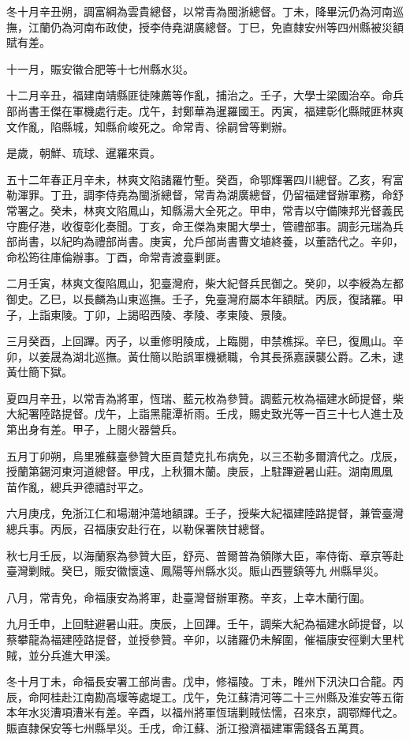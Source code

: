 \begin{pinyinscope}
冬十月辛丑朔，調富綱為雲貴總督，以常青為閩浙總督。丁未，降畢沅仍為河南巡撫，江蘭仍為河南布政使，授李侍堯湖廣總督。丁巳，免直隸安州等四州縣被災額賦有差。

十一月，賑安徽合肥等十七州縣水災。

十二月辛丑，福建南靖縣匪徒陳薦等作亂，捕治之。壬子，大學士梁國治卒。命兵部尚書王傑在軍機處行走。戊午，封鄭華為暹羅國王。丙寅，福建彰化縣賊匪林爽文作亂，陷縣城，知縣俞峻死之。命常青、徐嗣曾等剿辦。

是歲，朝鮮、琉球、暹羅來貢。

五十二年春正月辛未，林爽文陷諸羅竹塹。癸酉，命鄂輝署四川總督。乙亥，宥富勒渾罪。丁丑，調李侍堯為閩浙總督，常青為湖廣總督，仍留福建督辦軍務，命舒常署之。癸未，林爽文陷鳳山，知縣湯大全死之。甲申，常青以守備陳邦光督義民守鹿仔港，收復彰化奏聞。丁亥，命王傑為東閣大學士，管禮部事。調彭元瑞為兵部尚書，以紀昀為禮部尚書。庚寅，允戶部尚書曹文埴終養，以董誥代之。辛卯，命松筠往庫倫辦事。丁酉，命常青渡臺剿匪。

二月壬寅，林爽文復陷鳳山，犯臺灣府，柴大紀督兵民御之。癸卯，以李綬為左都御史。乙巳，以長麟為山東巡撫。壬子，免臺灣府屬本年額賦。丙辰，復諸羅。甲子，上詣東陵。丁卯，上謁昭西陵、孝陵、孝東陵、景陵。

三月癸酉，上回蹕。丙子，以重修明陵成，上臨閱，申禁樵採。辛巳，復鳳山。辛卯，以姜晟為湖北巡撫。黃仕簡以貽誤軍機褫職，令其長孫嘉謨襲公爵。乙未，逮黃仕簡下獄。

夏四月辛丑，以常青為將軍，恆瑞、藍元枚為參贊。調藍元枚為福建水師提督，柴大紀署陸路提督。戊午，上詣黑龍潭祈雨。壬戌，賜史致光等一百三十七人進士及第出身有差。甲子，上閱火器營兵。

五月丁卯朔，烏里雅蘇臺參贊大臣貢楚克扎布病免，以三丕勒多爾濟代之。戊辰，授蘭第錫河東河道總督。甲戌，上秋獮木蘭。庚辰，上駐蹕避暑山莊。湖南鳳凰苗作亂，總兵尹德禧討平之。

六月庚戌，免浙江仁和場潮沖蕩地額課。壬子，授柴大紀福建陸路提督，兼管臺灣總兵事。丙辰，召福康安赴行在，以勒保署陜甘總督。

秋七月壬辰，以海蘭察為參贊大臣，舒亮、普爾普為領隊大臣，率侍衛、章京等赴臺灣剿賊。癸巳，賑安徽懷遠、鳳陽等州縣水災。賑山西豐鎮等九州縣旱災。

八月，常青免，命福康安為將軍，赴臺灣督辦軍務。辛亥，上幸木蘭行圍。

九月壬申，上回駐避暑山莊。庚辰，上回蹕。壬午，調柴大紀為福建水師提督，以蔡攀龍為福建陸路提督，並授參贊。辛卯，以諸羅仍未解圍，催福康安徑剿大里杙賊，並分兵進大甲溪。

冬十月丁未，命福長安署工部尚書。戊申，修福陵。丁未，睢州下汛決口合龍。丙辰，命阿桂赴江南勘高堰等處堤工。戊午，免江蘇清河等二十三州縣及淮安等五衛本年水災漕項漕米有差。辛酉，以福州將軍恆瑞剿賊怯懦，召來京，調鄂輝代之。賑直隸保安等七州縣旱災。壬戌，命江蘇、浙江撥濟福建軍需錢各五萬貫。


\end{pinyinscope}
